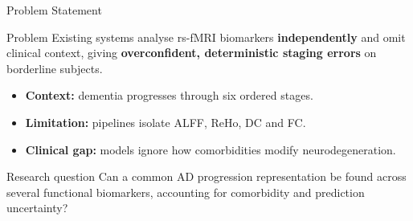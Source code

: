 \documentclass[aspectratio=169,11pt]{beamer}
\begin{document}
\begin{frame}{Problem Statement}
  \begin{alertblock}{Problem}
    Existing systems analyse rs-fMRI biomarkers \textbf{independently} and omit clinical
    context, giving \textbf{overconfident, deterministic staging errors} on borderline subjects.
  \end{alertblock}
  \vspace{0.2cm}
  \begin{itemize}
    \item \textbf{Context:} dementia progresses through six ordered stages.
    \item \textbf{Limitation:} pipelines isolate ALFF, ReHo, DC and FC.
    \item \textbf{Clinical gap:} models ignore how comorbidities modify neurodegeneration.
  \end{itemize}
  \begin{block}{Research question}
    Can a common AD progression representation be found across several functional
    biomarkers, accounting for comorbidity and prediction uncertainty?
  \end{block}
\end{frame}
\end{document}
